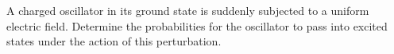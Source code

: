 A charged oscillator in its ground state is suddenly subjected to a uniform
electric field. Determine the probabilities for the oscillator to pass into
excited states under the action of this perturbation.
